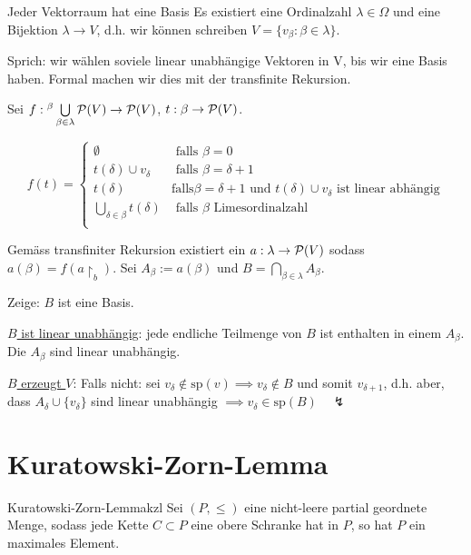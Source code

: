 \documentclass[12pt]{article}
\begin{document}
\begin{example}{Jeder Vektorraum hat eine Basis}{}
Es existiert eine Ordinalzahl $\lambda \in \Omega$ und eine Bijektion $\lambda \rightarrow V$, d.h. wir können schreiben $V = \{v_\beta : \beta \in \lambda\}$.

Sprich: wir wählen soviele linear unabhängige Vektoren in V, bis wir eine Basis haben. Formal machen wir dies mit der transfinite Rekursion.

Sei $f: {}^{\beta}\bigcup\limits_{\beta \in \lambda} \mathcal{P}(V) \rightarrow \mathcal{P}(V)$, $t: \beta \rightarrow \mathcal{P}(V)$.

$$
f(t) = \begin{cases}
    \emptyset & \text{ falls } \beta = 0 \\
    t(\delta) \cup {v_\delta} & \text{ falls } \beta = \delta + 1 \\
    t(\delta) & \text{falls} \beta = \delta + 1 \text{ und } t(\delta) \cup {v_\delta} \text{ ist linear abhängig} \\
    \bigcup\limits_{\delta \in \beta} t(\delta) & \text{ falls } \beta \text{ Limesordinalzahl} \\
\end{cases}
$$

Gemäss transfiniter Rekursion existiert ein $a: \lambda \rightarrow \mathcal{P}(V)$ sodass $a(\beta) = f(a\restriction_b)$. Sei $A_\beta := a(\beta)$ und $B = \bigcap\limits_{\beta \in \lambda} A_\beta$.

\end{example}

\begin{proofbox}
    Zeige: $B$ ist eine Basis.

    \underline{$B$ ist linear unabhängig}: jede endliche Teilmenge von $B$ ist enthalten in einem $A_\beta$. Die $A_\beta$ sind linear unabhängig.

    \underline{$B$ erzeugt $V$}: Falls nicht: sei $v_\delta \notin \text{sp}(v) \implies v_\delta \notin B$ und somit $v_{\delta+1}$, d.h. aber, dass $A_\delta \cup \{v_\delta\}$ sind linear unabhängig $\implies v_\delta \in \text{sp}(B) \quad \lightning$
\end{proofbox}

\section{Kuratowski-Zorn-Lemma}

\begin{lemma}{Kuratowski-Zorn-Lemma}{kzl}
Sei $(P, \leq)$ eine nicht-leere partial geordnete Menge, sodass jede Kette $C \subset P$ eine obere Schranke hat in $P$, so hat $P$ ein maximales Element.
\end{lemma}
\end{document}
